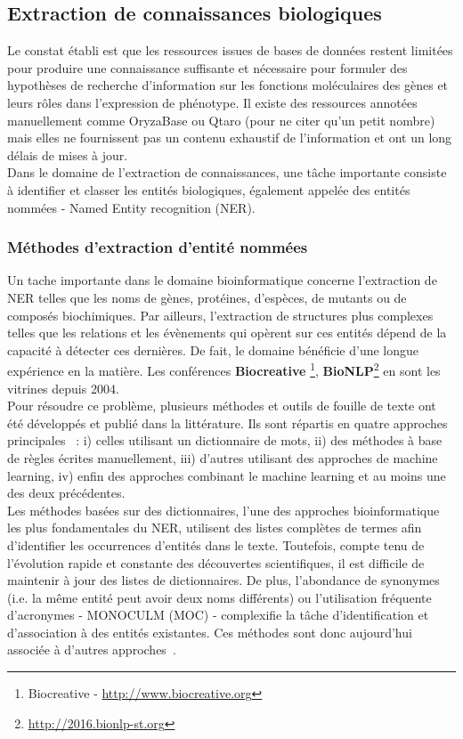 \subsection{Extraction de connaissances biologiques}

Le constat établi est que les ressources issues de bases de données restent limitées pour produire une connaissance suffisante et nécessaire pour formuler des hypothèses de recherche d’information sur les fonctions moléculaires des gènes et leurs rôles dans l’expression de phénotype. Il existe des ressources annotées manuellement comme OryzaBase ou Qtaro (pour ne citer qu'un petit nombre) mais elles ne fournissent pas un contenu exhaustif de l'information et ont un long délais de mises à jour. \\

Dans le domaine de l’extraction de connaissances, une tâche importante consiste à identifier et classer les entités biologiques, également appelée des entités nommées - Named Entity recognition (NER).

\subsubsection{Méthodes d'extraction d'entité nommées}
Un tache importante dans le domaine bioinformatique concerne l'extraction de NER telles que les noms de gènes, protéines, d'espèces, de mutants ou de composés biochimiques. Par ailleurs, l'extraction de structures plus complexes telles que les relations  et les évènements qui opèrent sur ces entités dépend de la capacité à détecter ces dernières. De fait, le domaine bénéficie d'une longue expérience en la matière.  Les conférences  \textbf{Biocreative} \footnote{Biocreative - \url{http://www.biocreative.org}}, \textbf{BioNLP}\footnote{\url{http://2016.bionlp-st.org}} en sont les vitrines depuis 2004.\\
 Pour résoudre ce problème, plusieurs méthodes et outils de fouille de texte ont été développés et publié dans la littérature. Ils sont répartis en quatre approches principales~\cite{Basaldella2017} : i)  celles utilisant un dictionnaire de mots, ii)  des méthodes à base de règles écrites manuellement, iii) d'autres utilisant des approches de machine learning, iv) enfin des approches combinant le machine learning et au moins une des deux précédentes.\\

Les méthodes basées sur des dictionnaires, l'une des approches bioinformatique les plus fondamentales du NER, utilisent des listes complètes de termes afin d'identifier les occurrences d'entités dans le texte. Toutefois, compte tenu de l'évolution rapide et constante des découvertes scientifiques, il est difficile de maintenir à jour des listes de dictionnaires. De plus, l'abondance de synonymes (i.e. la même entité peut avoir deux noms différents) ou l'utilisation fréquente d'acronymes - MONOCULM (MOC) - complexifie la tâche d'identification et d'association à des entités existantes. Ces méthodes sont donc aujourd'hui associée à d'autres approches~\cite{Hettne2009,Gerner2010}. \\

